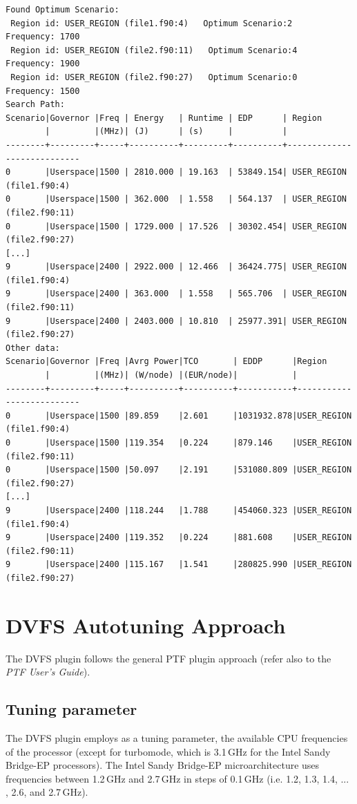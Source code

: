 \documentclass[11pt,a4paper, oneside]{book} %
\begin{document}
  
\begingroup
    \fontsize{8pt}{12pt}\selectfont
  \begin{verbatim}
Found Optimum Scenario:
 Region id: USER_REGION (file1.f90:4)   Optimum Scenario:2      Frequency: 1700
 Region id: USER_REGION (file2.f90:11)   Optimum Scenario:4      Frequency: 1900
 Region id: USER_REGION (file2.f90:27)   Optimum Scenario:0      Frequency: 1500
Search Path:
Scenario|Governor |Freq | Energy   | Runtime | EDP      | Region
        |         |(MHz)| (J)      | (s)     |          | 
--------+---------+-----+----------+---------+----------+----------------------------
0       |Userspace|1500 | 2810.000 | 19.163  | 53849.154| USER_REGION (file1.f90:4)
0       |Userspace|1500 | 362.000  | 1.558   | 564.137  | USER_REGION (file2.f90:11)
0       |Userspace|1500 | 1729.000 | 17.526  | 30302.454| USER_REGION (file2.f90:27)
[...] 
9       |Userspace|2400 | 2922.000 | 12.466  | 36424.775| USER_REGION (file1.f90:4)
9       |Userspace|2400 | 363.000  | 1.558   | 565.706  | USER_REGION (file2.f90:11)
9       |Userspace|2400 | 2403.000 | 10.810  | 25977.391| USER_REGION (file2.f90:27)
Other data:
Scenario|Governor |Freq |Avrg Power|TCO       | EDDP      |Region
        |         |(MHz)| (W/node) |(EUR/node)|           |
--------+---------+-----+----------+----------+-----------+--------------------------
0       |Userspace|1500 |89.859    |2.601     |1031932.878|USER_REGION (file1.f90:4)
0       |Userspace|1500 |119.354   |0.224     |879.146    |USER_REGION (file2.f90:11)
0       |Userspace|1500 |50.097    |2.191     |531080.809 |USER_REGION (file2.f90:27)
[...]
9       |Userspace|2400 |118.244   |1.788     |454060.323 |USER_REGION (file1.f90:4)
9       |Userspace|2400 |119.352   |0.224     |881.608    |USER_REGION (file2.f90:11)
9       |Userspace|2400 |115.167   |1.541     |280825.990 |USER_REGION (file2.f90:27)
  \end{verbatim} 
\endgroup



  
  
\chapter{DVFS Autotuning Approach}\label{sec:mappingPTF}
The DVFS plugin follows the general PTF plugin approach (refer also to the \textit{PTF User's Guide}).

  \section{Tuning parameter}
  The DVFS plugin employs as a tuning parameter, the available CPU frequencies of the processor (except for turbomode, which is 3.1\,GHz for the Intel Sandy Bridge-EP processors).
  The Intel Sandy Bridge-EP microarchitecture uses frequencies between 1.2\,GHz and 2.7\,GHz in steps of 0.1\,GHz (i.e. 1.2, 1.3, 1.4, ... , 2.6, and 2.7\,GHz).
\end{document}
